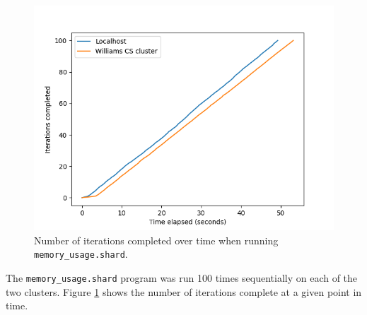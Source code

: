\documentclass[oneside]{report}
\begin{document}


\begin{figure}[h]
  \begin{center}
    \includegraphics[scale=0.9]{img/experiments/e1_1620966966721.png}
    \caption{Number of iterations completed over time when running \texttt{memory\_usage.shard}.}
    \label{fig:memoryusage}
  \end{center}
\end{figure}

The \texttt{memory\_usage.shard} program was run 100 times sequentially on each of the two clusters.
Figure \ref{fig:memoryusage} shows the number of iterations complete at a given point in time.
\end{document}
